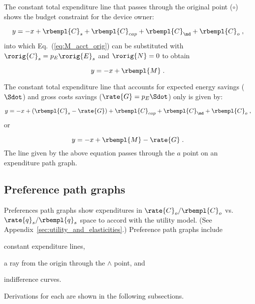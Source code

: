 The constant total expenditure line 
that passes through the original point ($\circ$)
shows the budget constraint for the device owner:

\begin{equation}
  y = -x + \rbempl{C}_s + \rbempl{C}_{cap} + \rbempl{C}_{\md} + \rbempl{C}_o \; ,
\end{equation}
%
into which Eq.~(\ref{eq:M_acct_orig}) can be substituted with 
$\rorig{C}_s = p_E \rorig{E}_s$ and 
$\rorig{N} = 0$ to obtain

\begin{equation}
  y = -x + \rbempl{M} \; .
\end{equation}

The constant total expenditure line 
that accounts for expected energy savings ($\Sdot$) 
and gross costs savings ($\rate{G} = p_E \Sdot$) only 
is given by:

\begin{equation}
  y = -x + (\rbempl{C}_s - \rate{G}) + \rbempl{C}_{cap} + \rbempl{C}_{\md} + \rbempl{C}_o \; ,
\end{equation}
%
or

\begin{equation}
  y = -x + \rbempl{M} - \rate{G}\; .
\end{equation}
%
The line given by the above equation
passes through the $a$ point on an expenditure path graph.


\subsection{Preference path graphs}
\label{sec:prefs_path_graph_details}

Preferences path graphs show expenditures in 
$\rate{C}_o/\rbempl{C}_o$ vs.\ $\rate{q}_s/\rbempl{q}_s$ space
to accord with the utility model.
(See Appendix~\ref{sec:utility_and_elasticities}.)
Preference path graphs include 
%
\begin{enumerate*}[label={(\alph*)}]
	
  \item constant expenditure lines,
  
  \item a ray from the origin through the $\wedge$ point, and 
  
  \item indifference curves.
    
\end{enumerate*}
%
Derivations for each are shown in the following subsections.


